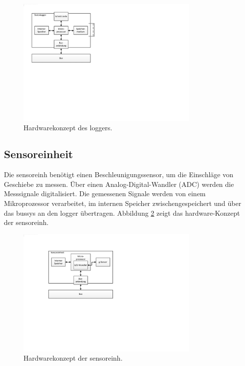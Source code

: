 \begin{figure}[H]
	\centering
		\includegraphics[width=0.8\textwidth]{images/visio/hardwarekonzept_logger.pdf}
	\caption{Hardwarekonzept des \gls{logger}s.}
	\label{fig.hwkonzept_logger}
\end{figure}

\subsection{Sensoreinheit}
Die \gls{sensoreinh} benötigt einen Beschleunigungssensor, um die Einschläge von Geschiebe zu messen. Über einen Analog-Digital-Wandler (ADC) werden die Messsignale digitalisiert. Die gemessenen Signale werden von einem Mikroprozessor verarbeitet, im internen Speicher zwischengespeichert und über das \gls{bussys} an den \gls{logger} übertragen. Abbildung \ref{fig.hwkonzept_sensor} zeigt das \gls{hardware}-Konzept der \gls{sensoreinh}.

\begin{figure}[H]
	\centering
		\includegraphics[width=0.8\textwidth]{images/visio/hardwarekonzept_sensor.pdf}
	\caption{Hardwarekonzept der \gls{sensoreinh}.}
	\label{fig.hwkonzept_sensor}
\end{figure}

